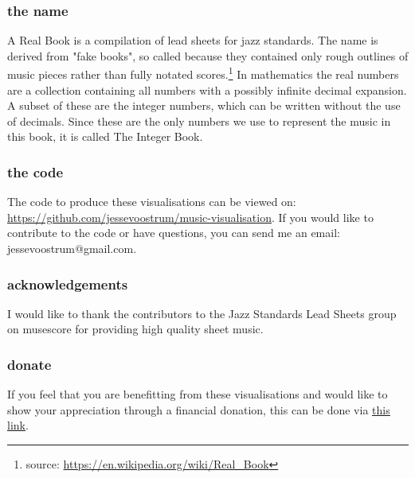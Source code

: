\subsubsection*{the name}
A Real Book is a compilation of lead sheets for jazz standards. The name is derived from "fake books", so called because they contained only rough outlines of music pieces rather than fully notated scores.\footnote{source: \url{https://en.wikipedia.org/wiki/Real_Book}} In mathematics the real numbers are a collection containing all numbers with a possibly infinite decimal expansion. A subset of these are the integer numbers, which can be written without the use of decimals. Since these are the only numbers we use to represent the music in this book, it is called The Integer Book.

\subsubsection*{the code}
The code to produce these visualisations can be viewed on: \url{https://github.com/jessevoostrum/music-visualisation}. If you would like to contribute to the code or have questions, you can send me an email: jessevoostrum@gmail.com.

\subsubsection*{acknowledgements}
I would like to thank the contributors to the Jazz Standards Lead Sheets group on musescore for providing high quality sheet music. 

\subsubsection*{donate}
If you feel that you are benefitting from these visualisations and would like to show your appreciation through a financial donation, this can be done via \href{https://www.paypal.com/cgi-bin/webscr?cmd=_donations&business=jessevoostrum@gmail.com&no_shipping=1&no_note=1&tax=0&currency_code=EUR&lc=US&bn=PP_DonationsBF}{\underline{this link}}. 

